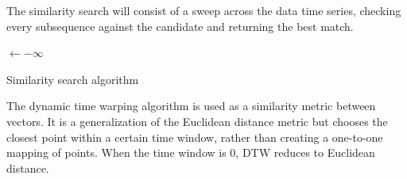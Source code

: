 The similarity search will consist of a sweep across the data time series, checking every subsequence against the candidate and returning the best match.
\begin{algorithm}[h]




 \Best$\leftarrow -\infty$\;
 \caption{Similarity search algorithm}
\end{algorithm}

The dynamic time warping algorithm is used as a similarity metric between vectors. It is a generalization of the Euclidean distance metric but chooses the closest point within a certain time window, rather than creating a one-to-one mapping of points. When the time window is 0, DTW reduces to Euclidean distance.


